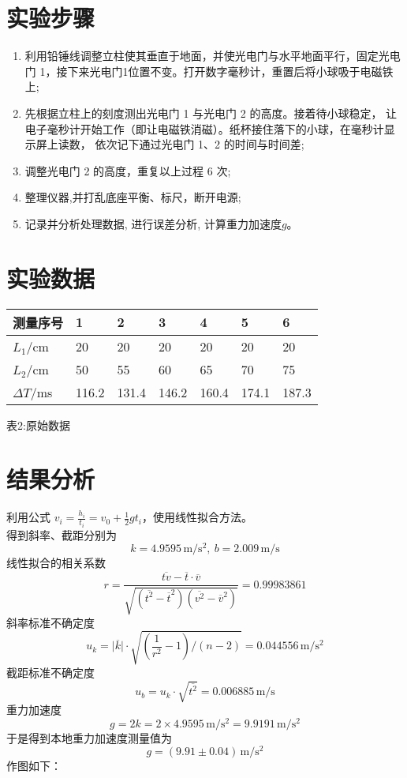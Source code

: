 \documentclass[UTF8]{article}
\newcommand{\sector}[2]{\section*{#1}%
\vspace*{-0.8em}\large{#2}%
\vspace*{-0.3em}
}
\begin{document}
{}\sector{实验步骤}{

    \begin{enumerate}
        \item 利用铅锤线调整立柱使其垂直于地面，并使光电门与水平地面平行，固定光电门 1，接下来光电门1位置不变。打开数字毫秒计，重置后将小球吸于电磁铁上;
        \item 先根据立柱上的刻度测出光电门 1 与光电门 2 的高度。接着待小球稳定，
        让电子毫秒计开始工作（即让电磁铁消磁）。纸杯接住落下的小球，在毫秒计显示屏上读数，
        依次记下通过光电门 1、2 的时间与时间差;
        \item 调整光电门 2 的高度，重复以上过程 6 次;
        \item 整理仪器,并打乱底座平衡、标尺，断开电源;
        \item 记录并分析处理数据, 进行误差分析, 计算重力加速度$g$。
    \end{enumerate}

}\sector{实验数据}{\vspace{1em}

\begin{center}
    \normalsize{
        \newcolumntype{Y}{>{\centering\arraybackslash}X}
        \begin{tabularx}{1\textwidth}{|Y|Y|Y|Y|Y|Y|Y|}
            \hline
            测量序号
                &  1&  2&  3&  4&  5& 6\\
            \hline
            $L_1$/cm
                &   20&   20&   20&   20&   20&   20\\
            \hline
            $L_2$/cm
                &   50&   55&   60&   65&   70&   75\\
            \hline
            $\Delta T$/ms
                &   116.2&   131.4&   146.2&   160.4&   174.1&   187.3\\
            \hline
        \end{tabularx}
        \vspace{0.3em}
    
        表2:原始数据
    }
\end{center}
\vspace{-1em}

}\sector{结果分析}{
\noindent
利用公式 $v_i = \frac{h_i}{t_i} = v_0 + \frac{1}{2}gt_i$，使用线性拟合方法。\\
得到斜率、截距分别为
$$
k=4.9595\,\mathrm{m/s^2},\ b=2.009\,\mathrm{m/s}
$$
线性拟合的相关系数
$$
r=\frac{\overline{tv}-\overline{t}\cdot\overline{v}}{\sqrt{\left(\overline{t^2}-\overline{t}^2\right)\left(\overline{v^2}-\overline{v}^2\right)}}=0.99983861
$$
斜率标准不确定度
$$
u_k=\lvert \overline{k}\rvert\cdot\sqrt{\left(\frac{1}{r^2}-1\right)/(n-2)}=0.044556\,\mathrm{m/s^2}
$$
截距标准不确定度
$$
u_b=u_k\cdot\sqrt{\overline{t^2}}=0.006885\,\mathrm{m/s}
$$
重力加速度
$$
g=2 k=2\times 4.9595\,\mathrm{m/s^2}=9.9191\,\mathrm{m/s^2}
$$
于是得到本地重力加速度测量值为
$$
g=\left(9.91 \pm 0.04\right)\,\mathrm{m/s^2}
$$
作图如下：

}
\end{document}
